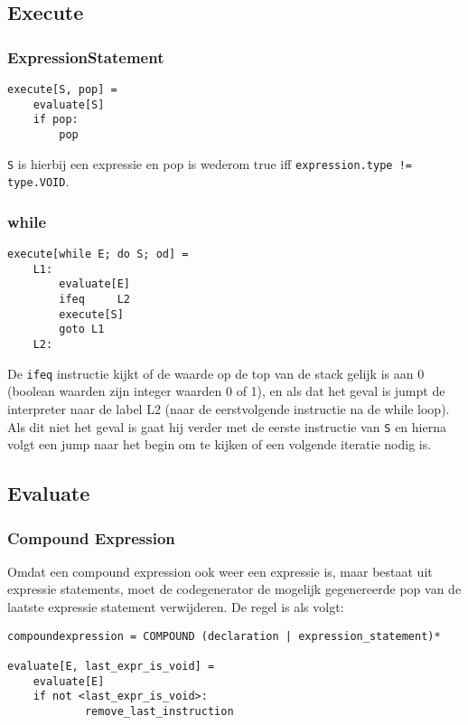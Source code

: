 \documentclass[]{article}
\begin{document}
\subsection{Execute}
\subsubsection{ExpressionStatement}

\begin{verbatim}
execute[S, pop] =
    evaluate[S]
    if pop:
        pop
\end{verbatim}

\texttt{S} is hierbij een expressie en pop is wederom true iff \texttt{expression.type != type.VOID}.

\subsubsection{while}
\begin{verbatim}
execute[while E; do S; od] =
    L1:
        evaluate[E]
        ifeq	 L2	
        execute[S]
        goto L1
    L2:
\end{verbatim}

De \texttt{ifeq} instructie kijkt of de waarde op de top van de stack gelijk is aan 0 (boolean waarden zijn integer waarden 0 of 1), en als dat het geval is jumpt de interpreter naar de label L2 (naar de eerstvolgende instructie na de while loop). Als dit niet het geval is gaat hij verder met de eerste instructie van \texttt{S} en hierna volgt een jump naar het begin om te kijken of een volgende iteratie nodig is.

\subsection{Evaluate}
\subsubsection{Compound Expression}
Omdat een compound expression ook weer een expressie is, maar bestaat uit expressie statements, moet de codegenerator de mogelijk gegenereerde pop van de laatste expressie statement verwijderen. De regel is als volgt:

\begin{verbatim}
compoundexpression = COMPOUND (declaration | expression_statement)*

evaluate[E, last_expr_is_void] =
    evaluate[E]
    if not <last_expr_is_void>:
    	    remove_last_instruction
\end{verbatim}
\end{document}
